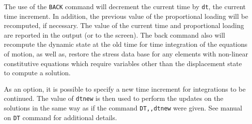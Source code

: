 \headb

The use of the {\tt BACK} command will decrement the
current time by {\tt dt}, the current time increment.  In addition,
the previous value of the proportional loading will be
recomputed, if necessary.  The value of the current time and
proportional loading are reported in the output (or to the
screen).  The back command also will recompute the dynamic
state at the old time for time integration of the equations
of motion, as well as, restore the stress data base for any
elements with non-linear constitutive equations which
require variables other than the displacement state to compute a solution.

As an option, it is possible to specify a new time
increment for integrations to be continued. The value of
{\tt dtnew} is then used to perform the updates on the solutions
in the same way as if the command {\tt DT,,dtnew} were given.
See manual on {\tt DT} command for additional details.
\vfill\eject
